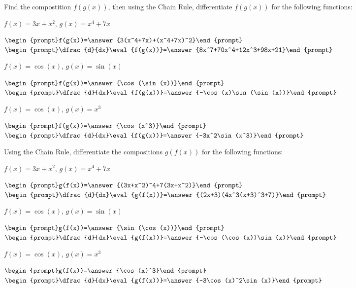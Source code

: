 \documentclass{ximera}
\begin{document}
\begin{question}

Find the compostition $f(g(x))$, then using the Chain Rule, differentiate $f(g(x))$ for the following functions:

$f(x) = 3x+x^2$, $g(x) = x^4+7x$

$\begin{prompt}f(g(x))=\answer{3(x^4+7x)+(x^4+7x)^2}\end{prompt}$
$\begin{prompt}\dfrac{d}{dx}\eval{f(g(x))}=\answer{8x^7+70x^4+12x^3+98x+21}\end{prompt}$

$f(x) = \cos(x)$, $g(x) = \sin(x)$

$\begin{prompt}f(g(x))=\answer{\cos(\sin(x))}\end{prompt}$
$\begin{prompt}\dfrac{d}{dx}\eval{f(g(x))}=\answer{-\cos(x)\sin(\sin(x))}\end{prompt}$

$f(x) = \cos(x)$, $g(x) = x^3$

$\begin{prompt}f(g(x))=\answer{\cos(x^3)}\end{prompt}$
$\begin{prompt}\dfrac{d}{dx}\eval{f(g(x))}=\answer{-3x^2\sin(x^3)}\end{prompt}$

\end{question}

\begin{question}

Using the Chain Rule, differentiate the compositions $g(f(x))$ for the following functions:

$f(x) = 3x+x^2$, $g(x) = x^4+7x$

$\begin{prompt}g(f(x))=\answer{(3x+x^2)^4+7(3x+x^2)}\end{prompt}$
$\begin{prompt}\dfrac{d}{dx}\eval{g(f(x))}=\answer{(2x+3)(4x^3(x+3)^3+7)}\end{prompt}$

$f(x) = \cos(x)$, $g(x) = \sin(x)$

$\begin{prompt}g(f(x))=\answer{\sin(\cos(x))}\end{prompt}$
$\begin{prompt}\dfrac{d}{dx}\eval{g(f(x))}=\answer{-\cos(\cos(x))\sin(x)}\end{prompt}$

$f(x) = \cos(x)$, $g(x) = x^3$

$\begin{prompt}g(f(x))=\answer{\cos(x)^3}\end{prompt}$
$\begin{prompt}\dfrac{d}{dx}\eval{g(f(x))}=\answer{-3\cos(x)^2\sin(x)}\end{prompt}$


\end{question}
\end{document}
